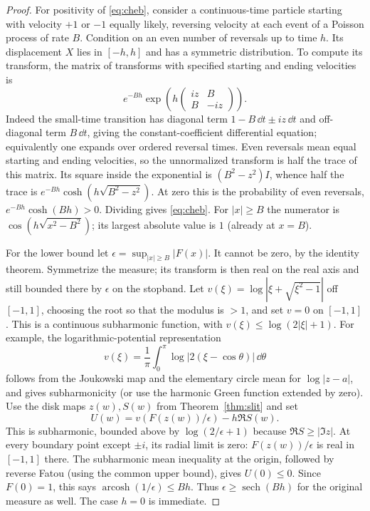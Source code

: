 \documentclass[11pt]{article}
\theoremstyle{remark}\newtheorem{remark}[theorem]{Remark}
\newcommand{\arcosh}{\operatorname{arcosh}}\newcommand{\ord}{\operatorname{ord}}
\begin{document}
\begin{proof}
For positivity of \eqref{eq:cheb}, consider a continuous-time particle starting with velocity $+1$ or $-1$ equally likely, reversing velocity at each event of a Poisson process of rate $B$. Condition on an even number of reversals up to time $h$. Its displacement $X$ lies in $[-h,h]$ and has a symmetric distribution. To compute its transform, the matrix of transforms with specified starting and ending velocities is
\[
 e^{-Bh}\exp\left(h\begin{pmatrix} iz&B\\ B&-iz\end{pmatrix}\right).
\]
Indeed the small-time transition has diagonal term $1-B\,\dd t\pm iz\,\dd t$ and off-diagonal term $B\,\dd t$, giving the constant-coefficient differential equation; equivalently one expands over ordered reversal times. Even reversals mean equal starting and ending velocities, so the unnormalized transform is half the trace of this matrix. Its square inside the exponential is $(B^2-z^2)I$, whence half the trace is $e^{-Bh}\cosh(h\sqrt{B^2-z^2})$. At zero this is the probability of even reversals, $e^{-Bh}\cosh(Bh)>0$. Dividing gives \eqref{eq:cheb}. For $|x|\ge B$ the numerator is $\cos(h\sqrt{x^2-B^2})$; its largest absolute value is $1$ (already at $x=B$).

For the lower bound let $\epsilon=\sup_{|x|\ge B}|F(x)|$. It cannot be zero, by the identity theorem. Symmetrize the measure; its transform is then real on the real axis and still bounded there by $\epsilon$ on the stopband. Let $v(\xi)=\log|\xi+\sqrt{\xi^2-1}|$ off $[-1,1]$, choosing the root so that the modulus is $>1$, and set $v=0$ on $[-1,1]$. This is a continuous subharmonic function, with $v(\xi)\le\log(2|\xi|+1)$. For example, the logarithmic-potential representation
\[
 v(\xi)=\frac1\pi\int_0^\pi\log|2(\xi-\cos\theta)|\,\dd\theta
\]
follows from the Joukowski map and the elementary circle mean for $\log|z-a|$, and gives subharmonicity (or use the harmonic Green function extended by zero). Use the disk maps $z(w),S(w)$ from Theorem~\ref{thm:slit} and set
\[
 U(w)=v(F(z(w))/\epsilon)-h\Re S(w).
\]
This is subharmonic, bounded above by $\log(2/\epsilon+1)$ because $\Re S\ge|\Im z|$. At every boundary point except $\pm i$, its radial limit is zero: $F(z(w))/\epsilon$ is real in $[-1,1]$ there. The subharmonic mean inequality at the origin, followed by reverse Fatou (using the common upper bound), gives $U(0)\le0$. Since $F(0)=1$, this says $\arcosh(1/\epsilon)\le Bh$. Thus $\epsilon\ge\operatorname{sech}(Bh)$ for the original measure as well. The case $h=0$ is immediate.
\end{proof}
\end{document}
